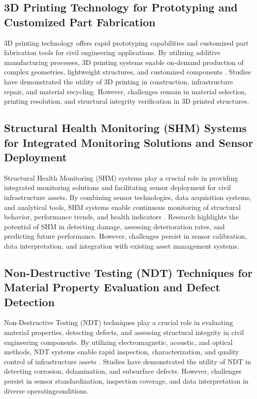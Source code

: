 \documentclass[journal, a4paper]{IEEEtran}
\begin{document}
\subsection{3D Printing Technology for Prototyping and Customized Part Fabrication}
3D printing technology offers rapid prototyping capabilities and customized part fabrication tools for civil
engineering applications. By utilizing additive manufacturing processes, 3D printing systems enable on-demand
production of complex geometries, lightweight structures, and customized components \cite{de_menezes_defect_2021} \cite{wang_fatigue_2023} \cite{yifei_structure_2023}. Studies
have demonstrated the utility of 3D printing in construction, infrastructure repair, and material recycling.
However, challenges remain in material selection, printing resolution, and structural integrity verification in
3D printed structures. 

\subsection{Structural Health Monitoring (SHM) Systems for Integrated Monitoring Solutions and Sensor Deployment}
Structural Health Monitoring (SHM) systems play a crucial role in providing integrated monitoring solutions and
facilitating sensor deployment for civil infrastructure assets. By combining sensor technologies, data acquisition
systems, and analytical tools, SHM systems enable continuous monitoring of structural behavior, performance trends,
and health indicators \cite{zhang_structural_2021} \cite{zhang_defect_2020} \cite{bevan_automated_2022}. Research highlights the potential of SHM in detecting damage, assessing
deterioration rates, and predicting future performance. However, challenges persist in sensor calibration, data
interpretation, and integration with existing asset management systems.



\subsection{Non-Destructive Testing (NDT) Techniques for Material Property Evaluation and Defect Detection}
Non-Destructive Testing (NDT) techniques play a crucial role in evaluating material properties, detecting defects,
and assessing structural integrity in civil engineering components. By utilizing electromagnetic, acoustic, and
optical methods, NDT systems enable rapid inspection, characterization, and quality control of infrastructure assets
\cite{li_physics-informed_2023} \cite{han_crack_2021} \cite{bevan_automated_2022}. Studies have demonstrated the utility of NDT in detecting corrosion, delamination, and subsurface defects.
However, challenges persist in sensor standardization, inspection coverage,
and data interpretation in diverse operatingconditions.
\end{document}

